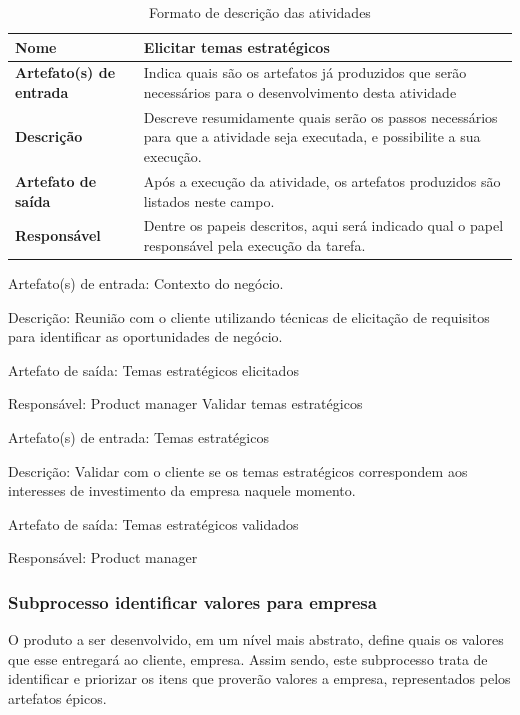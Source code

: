 \begin{table}[h]
    \centering
    \label{descricaoAtividades}
    \caption{Formato de descrição das atividades}
        \begin{tabular}{|l|p{10cm}|}
        \hline
        \textbf{Nome} & Elicitar temas estratégicos \\
        \hline
        \textbf{Artefato(s) de entrada} & Indica quais são os artefatos já produzidos que serão necessários para o desenvolvimento desta atividade \\
        \hline
        \textbf{Descrição} & Descreve resumidamente quais serão os passos necessários para que a atividade seja executada, e possibilite a sua execução. \\
        \hline
        \textbf{Artefato de saída} & Após a execução da atividade, os artefatos produzidos são listados neste campo. \\
        \hline
        \textbf{Responsável} & Dentre os papeis descritos, aqui será indicado qual o papel responsável pela execução da tarefa.\\
        \hline
    \end{tabular}
\end{table}

Artefato(s) de entrada: Contexto do negócio.

Descrição: Reunião com o cliente utilizando técnicas de elicitação de requisitos para identificar as oportunidades de negócio.

Artefato de saída: Temas estratégicos elicitados

Responsável: Product manager
Validar temas estratégicos

Artefato(s) de entrada: Temas estratégicos

Descrição: Validar com o cliente se os temas estratégicos correspondem aos interesses de investimento da empresa naquele momento.

Artefato de saída: Temas estratégicos validados

Responsável: Product manager

\subsubsection{ Subprocesso identificar valores para empresa}

O produto a ser desenvolvido, em um nível mais abstrato, define quais os valores que esse entregará ao cliente, empresa. Assim sendo, este subprocesso trata de identificar e priorizar os itens que proverão valores a empresa, representados pelos artefatos épicos.

